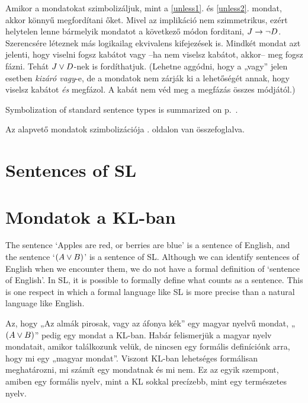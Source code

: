 Amikor a mondatokat szimbolizáljuk, mint a \ref{unless1}. és \ref{unless2}. mondat, akkor könnyű megfordítani őket. Mivel az implikáció nem szimmetrikus, ezért helytelen lenne bármelyik mondatot a következő módon forditani, $J \rightarrow \neg D$. Szerencsére léteznek más logikailag ekvivalens kifejezések is. Mindkét mondat azt jelenti, hogy viselni fogsz kabátot vagy --ha nem viselsz kabátot, akkor-- meg fogsz fázni. Tehát $J \vee D$-nek is fordíthatjuk. (Lehetne aggódni, hogy a „vagy” jelen esetben \emph{kizáró vagy}-e, de a mondatok nem zárják ki a lehetőségét annak, hogy viselsz kabátot \emph{és} megfázol. A kabát nem véd meg a megfázás összes módjától.)



Symbolization of standard sentence types is summarized on p.~\pageref{app.symbolization}.

Az alapvető mondatok szimbolizációja . oldalon van összefoglalva.





\section*{Sentences of SL}
\section{Mondatok a KL-ban}
The sentence `Apples are red, or berries are blue' is a sentence of English, and the sentence `$(A\vee B)$' is a sentence of SL. Although we can identify sentences of English when we encounter them, we do not have a formal definition of `sentence of English'. In SL, it is possible to formally define what counts as a sentence. This is one respect in which a formal language like SL is more precise than a natural language like English.

Az, hogy „Az almák pirosak, vagy az áfonya kék” egy magyar nyelvű mondat, „$(A\vee B)$” pedig egy mondat a KL-ban. Habár felismerjük a magyar nyelv mondatait, amikor találkozunk velük, de nincsen egy formális definíciónk arra, hogy mi egy „magyar mondat”. Viszont KL-ban lehetséges formálisan meghatározni, mi számít egy mondatnak és mi nem. Ez az egyik szempont, amiben egy formális nyelv, mint a KL sokkal precízebb, mint egy természetes nyelv.

